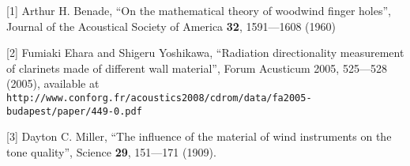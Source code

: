   \sectionreferences{}[1] Arthur H. Benade, “On the mathematical theory of 
  woodwind finger holes”, Journal of the Acoustical Society of America 
  \textbf{32}, 1591—1608 (1960) 

  [2] Fumiaki Ehara and Shigeru Yoshikawa, “Radiation directionality 
  measurement of clarinets made of different wall material”, Forum Acusticum 
  2005, 525—528 (2005), available at 
  \tt{}http://www.conforg.fr/acoustics2008/cdrom/data/fa2005-budapest/paper/449-0.pdf\rm{} 

  [3] Dayton C. Miller, “The influence of the material of wind instruments on 
  the tone quality”, Science \textbf{29}, 151—171 (1909). 
